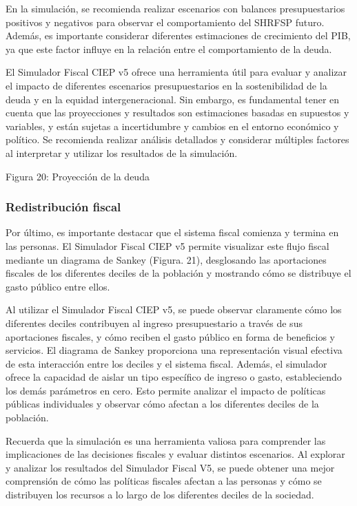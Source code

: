 En la simulación, se recomienda realizar escenarios con balances
presupuestarios positivos y negativos para observar el comportamiento
del SHRFSP futuro. Además, es importante considerar diferentes
estimaciones de crecimiento del PIB, ya que este factor influye en la
relación entre el comportamiento de la deuda.

El Simulador Fiscal CIEP v5 ofrece una herramienta útil para evaluar y
analizar el impacto de diferentes escenarios presupuestarios en la
sostenibilidad de la deuda y en la equidad intergeneracional. Sin
embargo, es fundamental tener en cuenta que las proyecciones y
resultados son estimaciones basadas en supuestos y variables, y están
sujetas a incertidumbre y cambios en el entorno económico y político. Se
recomienda realizar análisis detallados y considerar múltiples factores
al interpretar y utilizar los resultados de la simulación.

Figura 20: Proyección de la deuda


\hypertarget{redistribuciuxf3n-fiscal}{%
\subsubsection{Redistribución fiscal}\label{redistribuciuxf3n-fiscal}}

Por último, es importante destacar que el sistema fiscal comienza y
termina en las personas. El Simulador Fiscal CIEP v5 permite visualizar
este flujo fiscal mediante un diagrama de Sankey (Figura. 21),
desglosando las aportaciones fiscales de los diferentes deciles de la
población y mostrando cómo se distribuye el gasto público entre ellos.

Al utilizar el Simulador Fiscal CIEP v5, se puede observar claramente
cómo los diferentes deciles contribuyen al ingreso presupuestario a
través de sus aportaciones fiscales, y cómo reciben el gasto público en
forma de beneficios y servicios. El diagrama de Sankey proporciona una
representación visual efectiva de esta interacción entre los deciles y
el sistema fiscal. Además, el simulador ofrece la capacidad de aislar un
tipo específico de ingreso o gasto, estableciendo los demás parámetros
en cero. Esto permite analizar el impacto de políticas públicas
individuales y observar cómo afectan a los diferentes deciles de la
población.

Recuerda que la simulación es una herramienta valiosa para comprender
las implicaciones de las decisiones fiscales y evaluar distintos
escenarios. Al explorar y analizar los resultados del Simulador Fiscal
V5, se puede obtener una mejor comprensión de cómo las políticas
fiscales afectan a las personas y cómo se distribuyen los recursos a lo
largo de los diferentes deciles de la sociedad.

